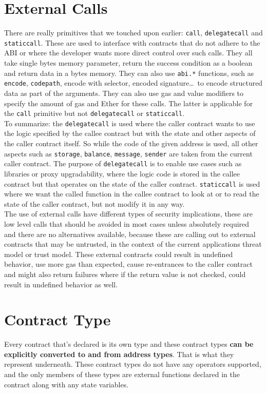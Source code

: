 \section{External Calls}
There are really primitives that we touched upon earlier: \texttt{call}, \texttt{delegatecall} and \texttt{staticcall}. These are used to interface with contracts that do not adhere to the ABI or where the developer wants more direct control over such calls. They all take single bytes memory parameter, return the success condition as a boolean and return data in a bytes memory. They can also use \texttt{abi.*} functions, such as \texttt{encode}, \texttt{codepath}, encode with selector, encoded signature\dots\, to encode structured data as part of the arguments. They can also use gas and value modifiers to specify the amount of gas and Ether for these calls. The latter is applicable for the \texttt{call} primitive but not \texttt{delegatecall} or \texttt{staticcall}.\\

To summarize: the \texttt{delegatecall} is used where the caller contract wants to use the logic specified by the callee contract but with the state and other aspects of the caller contract itself. So while the code of the given address is used, all other aspects such as \texttt{storage}, \texttt{balance}, \texttt{message}, \texttt{sender} are taken from the current caller contract. The purpose of \texttt{delegatecall} is to enable use cases such as libraries or proxy upgradability, where the logic code is stored in the callee contract but that operates on the state of the caller contract. \texttt{staticcall} is used where we want the called function in the callee contract to look at or to read the state of the caller contract, but not modify it in any way.\\

The use of external calls have different types of security implications, these are low level calls that should be avoided in most cases unless absolutely required and there are no alternatives available, because these are calling out to external contracts that may be untrusted, in the context of the current applications threat model or trust model. These external contracts could result in undefined behavior, use more gas than expected, cause re-entrances to the caller contract and might also return failures where if the return value is not checked, could result in undefined behavior as well.\\

\section{Contract Type}
Every contract that's declared is its own type and these contract types \textbf{can be explicitly converted to and from address types}. That is what they represent underneath. These contract types do not have any operators supported, and the only members of these types are external functions declared in the contract along with any state variables.


